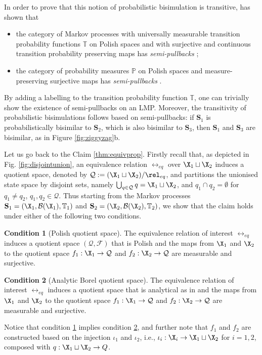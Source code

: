\documentclass[letterpaper, 10 pt, conference]{amsart}
\theoremstyle{definition}
\theoremstyle{example}
\newtheorem{condition}{Condition}
\theoremstyle{remark}
\begin{document}
In order to prove that this notion of probabilistic bisimulation is transitive, 
\cite{Edalat1999a} has shown that
\begin{itemize}
\item the category of Markov processes with universally measurable transition probability functions $\mathbb T$ on Polish spaces and with surjective and continuous transition probability preserving maps has \emph{semi-pullbacks} \cite [Corollary 5.3]{Edalat1999a}; 
\item the category of probability measures $\mathbb P$ on Polish spaces and measure-preserving surjective maps has  \emph{semi-pullbacks} \cite[Corollary 5.4]{Edalat1999a}. 
\end{itemize}
By adding a labelling to the transition probability function $\mathbb T$, one can trivially show the existence of semi-pullbacks on an LMP.
Moreover, the transitivity of probabilistic bisimulations follows based on semi-pullbacks:  if $\mathbf S_1$ is probabilistically  bisimilar to $\mathbf S_2$, which is also bisimilar to $\mathbf S_3$, then $\mathbf S_1$ and $\mathbf S_3$ are bisimilar, as in Figure \ref{fig:ziggyzag}b.

  
Let us go back to the Claim \ref{thm:equivprop}. Firstly recall that, as depicted in Fig. \ref{fig:disjointunion}, 
an equivalence relation $\rel_{eq}$ over $ \X_1\sqcup \X_2$ induces a quotient space, denoted by $\mathcal Q:=( \X_1\sqcup \X_2)/\rel_{eq}$,  
and partitions the unionised state space by disjoint sets, 
namely $\bigcup_{q\in\mathcal Q}q= \X_1\sqcup \X_2$, and $q_1\cap q_2=\emptyset$ for $q_1\not=q_2$, $q_1,q_2\in\mathcal Q$. 
Thus starting from the Markov processes $\mathbf S_1=(\X_1, \mathcal B(\X_1),\mathbb T_1)$  and $\mathbf S_2=(\X_2, \mathcal B(\X_2),\mathbb T_2)$,  
we show that the claim holds under either of the following two conditions. 
\begin{condition}[Polish quotient space]\label{quotient:Polish}
The equivalence relation of interest $\rel_{eq}$ induces a quotient space $(\mathcal Q,\mathcal{F})$ that is Polish  and the maps from $\X_1$ and $\X_2$ to the quotient space $f_1:\X_1\rightarrow \mathcal Q$ and $f_2:\X_2\rightarrow \mathcal Q$ are measurable and surjective.  
\end{condition}
\begin{condition}[Analytic Borel quotient space]\label{quotient:analytical}
The equivalence relation of interest $\rel_{eq}$ induces a quotient space that is analytical as in \cite{Desharnais2002,Edalat1999a} and  the maps from $\X_1$ and $\X_2$ to the quotient space $f_1:\X_1\rightarrow \mathcal Q$ and $f_2:\X_2\rightarrow \mathcal Q$ are measurable and surjective.  
\end{condition}
Notice that condition \ref{quotient:Polish} implies condition \ref{quotient:analytical}, 
and further note that $f_1$ and $f_2$ are constructed based on the injection $\iota_1$ and $\iota_2$, i.e., 
$ \iota_i:\X_i\rightarrow \X_1\sqcup\X_2$ for $i=1,2$, composed with $q:\X_1\sqcup\X_2\rightarrow Q$.
 
\end{document}
